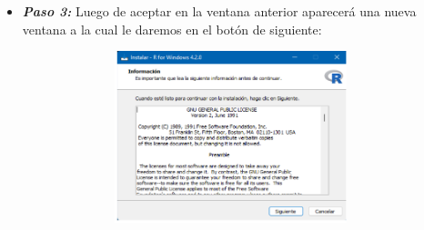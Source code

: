 \documentclass{article}
\begin{document}
\begin{itemize}
\begin{figure}[H]
\caption{\label{fig1}}
\end{figure}
\item \textbf{\textit{Paso 3: }}  Luego de aceptar en la ventana anterior aparecerá una nueva ventana a la cual le daremos en el botón de siguiente:
\begin{figure}[H]
\centering
\includegraphics[width=10cm,height=5cm]{imagenes/Paso3.png}
\caption{\label{fig2}}
\end{figure}
   

\end{itemize}
\end{document}
